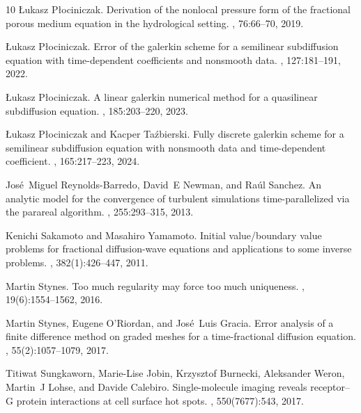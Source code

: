 \documentclass[12pt,a4paper]{article}
\begin{document}
\begin{thebibliography}{10}
	{\L}ukasz P{\l}ociniczak.
	\newblock Derivation of the nonlocal pressure form of the fractional porous
	medium equation in the hydrological setting.
	,
	76:66--70, 2019.
	
	{\L}ukasz P{\l}ociniczak.
	\newblock Error of the galerkin scheme for a semilinear subdiffusion equation
	with time-dependent coefficients and nonsmooth data.
	, 127:181--191, 2022.
	
	{\L}ukasz P{\l}ociniczak.
	\newblock A linear galerkin numerical method for a quasilinear subdiffusion
	equation.
	, 185:203--220, 2023.
	
	{\L}ukasz P{\l}ociniczak and Kacper Ta{\'z}bierski.
	\newblock Fully discrete galerkin scheme for a semilinear subdiffusion equation
	with nonsmooth data and time-dependent coefficient.
	, 165:217--223, 2024.
	
	Jos{\'e}~Miguel Reynolds-Barredo, David~E Newman, and Ra{\'u}l Sanchez.
	\newblock An analytic model for the convergence of turbulent simulations
	time-parallelized via the parareal algorithm.
	, 255:293--315, 2013.
	
	Kenichi Sakamoto and Masahiro Yamamoto.
	\newblock Initial value/boundary value problems for fractional diffusion-wave
	equations and applications to some inverse problems.
	,
	382(1):426--447, 2011.
	
	Martin Stynes.
	\newblock Too much regularity may force too much uniqueness.
	, 19(6):1554--1562,
	2016.
	
	Martin Stynes, Eugene O'Riordan, and Jos{\'e}~Luis Gracia.
	\newblock Error analysis of a finite difference method on graded meshes for a
	time-fractional diffusion equation.
	, 55(2):1057--1079, 2017.
	
	Titiwat Sungkaworn, Marie-Lise Jobin, Krzysztof Burnecki, Aleksander Weron,
	Martin~J Lohse, and Davide Calebiro.
	\newblock Single-molecule imaging reveals {receptor--G protein} interactions at
	cell surface hot spots.
	, 550(7677):543, 2017.
	

\end{thebibliography}
\end{document}
